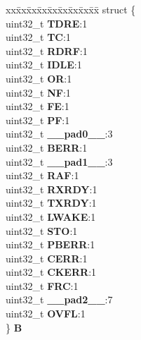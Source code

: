 \begin{DoxyCompactItemize}
\begin{tabbing}
\end{tabbing}\item 
\mbox{\label{unionESCI__tag_1_1ESCI__SR__tag_aeafadb44f26ef24de8bdaf1413232e8e}} 
\begin{tabbing}
xx\=xx\=xx\=xx\=xx\=xx\=xx\=xx\=xx\=\kill
struct \{\\
\>uint32\_t {\bfseries TDRE}:1\\
\>uint32\_t {\bfseries TC}:1\\
\>uint32\_t {\bfseries RDRF}:1\\
\>uint32\_t {\bfseries IDLE}:1\\
\>uint32\_t {\bfseries OR}:1\\
\>uint32\_t {\bfseries NF}:1\\
\>uint32\_t {\bfseries FE}:1\\
\>uint32\_t {\bfseries PF}:1\\
\>uint32\_t {\bfseries \_\_pad0\_\_}:3\\
\>uint32\_t {\bfseries BERR}:1\\
\>uint32\_t {\bfseries \_\_pad1\_\_}:3\\
\>uint32\_t {\bfseries RAF}:1\\
\>uint32\_t {\bfseries RXRDY}:1\\
\>uint32\_t {\bfseries TXRDY}:1\\
\>uint32\_t {\bfseries LWAKE}:1\\
\>uint32\_t {\bfseries STO}:1\\
\>uint32\_t {\bfseries PBERR}:1\\
\>uint32\_t {\bfseries CERR}:1\\
\>uint32\_t {\bfseries CKERR}:1\\
\>uint32\_t {\bfseries FRC}:1\\
\>uint32\_t {\bfseries \_\_pad2\_\_}:7\\
\>uint32\_t {\bfseries OVFL}:1\\
\} {\bfseries B}\\


\end{tabbing}
\end{DoxyCompactItemize}
